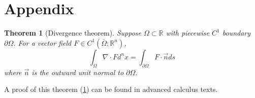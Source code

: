 \documentclass{article}
\newtheorem{theorem}{Theorem}[section]
\numberwithin{equation}{section}
\begin{document}
\newpage

\appendix
\section{Appendix}

\begin{theorem}[Divergence theorem]
Suppose $\Omega \subset \mathbb{R}$ with piecewise $C^1$ boundary $\partial \Omega$. For a vector field $F \in C^1(\bar \Omega; \mathbb{R}^n)$, 
\begin{equation}
    \int_\Omega \nabla \cdot F d^nx = \int_{\partial \Omega} F \cdot \vec{n} ds
\end{equation}
where $\vec{n} $ is the outward unit normal to $\partial \Omega$.
\label{Thm:Divergence}
\end{theorem}
A proof of this theorem (\ref{Thm:Divergence}) can be found in advanced calculus texts. 


\newpage
\printbibliography
\end{document}
